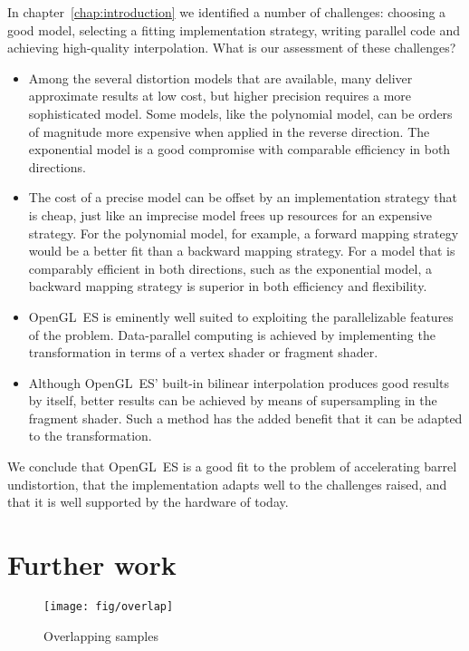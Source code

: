 \documentclass[english,12pt]{ifimaster}
\begin{document}
In chapter~\ref{chap:introduction} we identified a number of
challenges: choosing a good model, selecting a fitting implementation
strategy, writing parallel code and achieving high-quality
interpolation. What is our assessment of these challenges?
\begin{itemize}
\item Among the several distortion models that are available, many
  deliver approximate results at low cost, but higher precision
  requires a more sophisticated model. Some models, like the
  polynomial model, can be orders of magnitude more expensive when
  applied in the reverse direction. The exponential model is a good
  compromise with comparable efficiency in both directions.
\item The cost of a precise model can be offset by an implementation
  strategy that is cheap, just like an imprecise model frees up
  resources for an expensive strategy. For the polynomial model, for
  example, a forward mapping strategy would be a better fit than a
  backward mapping strategy. For a model that is comparably efficient
  in both directions, such as the exponential model, a backward
  mapping strategy is superior in both efficiency and flexibility.
\item OpenGL~ES is eminently well suited to exploiting the
  parallelizable features of the problem. Data-parallel computing is
  achieved by implementing the transformation in terms of a vertex
  shader or fragment shader.
\item Although OpenGL~ES' built-in bilinear interpolation produces
  good results by itself, better results can be achieved by means of
  supersampling in the fragment shader. Such a method has the added
  benefit that it can be adapted to the transformation.
\end{itemize}
We conclude that OpenGL~ES is a good fit to the problem of
accelerating barrel undistortion, that the implementation adapts well
to the challenges raised, and that it is well supported by the
hardware of today.

\section{Further work}
\label{sec:furtherwork}

\begin{figure}
  \centering
  \texttt{[image: fig/overlap]}
  \caption{Overlapping samples}
  \label{fig:overlap}
\end{figure}
\end{document}
